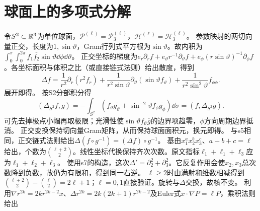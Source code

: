 \documentclass[UTF8,fontset=fandol,11pt]{ctexart}
\begin{document}
\section{球面上的多项式分解}
令$S^2\subset\mathbb R^3$为单位球面，$\mathcal P^{(\ell)}=\mathcal P_3^{(\ell)}$，$\mathcal H^{(\ell)}=\mathcal H_3^{(\ell)}$。
参数映射的两切向量正交，长度为$1,\sin\vartheta$，Gram行列式平方根为$\sin\vartheta$。故内积为$\int_0^\pi\int_0^{2\pi}f_1\overline{f_2}\sin\vartheta\dd\phi\dd\vartheta$。
正交坐标的梯度为$e_r\partial_rf+e_\vartheta r^{-1}\partial_\vartheta f+e_\phi(r\sin\vartheta)^{-1}\partial_\phi f$。各坐标面积与体积之比（或直接链式法则）给出散度，得到
\[\Delta f=\frac1{r^2}\partial_r(r^2f_r)+\frac1{r^2\sin\vartheta}\partial_\vartheta(\sin\vartheta f_\vartheta)+\frac1{r^2\sin^2\vartheta}f_{\phi\phi}.\]
展开即得。
按S2分部积分得
\[(\Delta_{S^2}f,g)=-\int_{S^2}\left(f_\vartheta\overline{g_\vartheta}+\sin^{-2}\vartheta f_\phi\overline{g_\phi}\right)\dd\sigma=(f,\Delta_{S^2}g).\]
可先去掉极点小帽再取极限；光滑性使$\sin\vartheta f_\vartheta\overline g$的边界项趋零，$\phi$方向周期边界抵消。
正交变换保持切向量Gram矩阵，从而保持球面面积元，换元即得。
与s5相同，正交链式法则给出$\Delta(f\circ g^{-1})=(\Delta f)\circ g^{-1}$。
基由$x_1^ax_2^bx_3^c$、$a+b+c=\ell$给出，个数为$\binom{\ell+2}2$。线性坐标代换保持齐次次数。原文指标$\ell_1+\ell_1+\ell_3$应为$\ell_1+\ell_2+\ell_3$。
使用s7的构造，这次$\Delta'=\partial_2^2+\partial_3^2$。它反复作用会使$x_2,x_3$总次数降到负数，故仍为有限和，得到同一右逆。
$\ell\ge2$时由满射和维数相减得到$\binom{\ell+2}2-\binom\ell2=2\ell+1$；$\ell=0,1$直接验证。旋转与$\Delta$交换，故核不变。
利用$\nabla r^{2k}=2kr^{2k-2}x$、$\Delta r^{2k}=2k(2k+1)r^{2k-2}$及Euler式$x\cdot\nabla P=\ell P$，乘积法则给出
\end{document}
